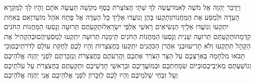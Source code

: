 \documentclass[../main/main.tex]{subfiles}
\begin{document}
\begin{multicols}{\ncols}
וַיְדַבֵּר יַהְוֶה אֶל מֹשֶׁה לֵּאמֹר\PreVerseSpace{}עֲשֵׂה לְךָ שְׁתֵּי חֲצוֹצְרֹת כֶּסֶף מִקְשָׁה תַּעֲשֶׂה אֹתָם וְהָיוּ לְךָ לְמִקְרָא הָעֵדָה וּלְמַסַּע אֶת הַמַּחֲנוֹת\PreVerseSpace{}וְתָקְעוּ בָּהֵן וְנוֹעֲדוּ אֵלֶיךָ כָּל הָעֵדָה אֶל פֶּתַח אֹהֶל מוֹעֵד\PreVerseSpace{}וְאִם בְּאַחַת יִתְקָעוּ וְנוֹעֲדוּ אֵלֶיךָ הַנְּשִׂיאִים רָאשֵׁי אַלְפֵי יִשְׂרָאֵל\PreVerseSpace{}וּתְקַעְתֶּם תְּרוּעָה וְנָסְעוּ הַמַּחֲנוֹת הַחֹנִים קֵדְמָה\PreVerseSpace{}וּתְקַעְתֶּם תְּרוּעָה שֵׁנִית וְנָסְעוּ הַמַּחֲנוֹת הַחֹנִים תֵּימָנָה תְּרוּעָה יִתְקְעוּ לְמַסְעֵיהֶם\PreVerseSpace{}וּבְהַקְהִיל אֶת הַקָּהָל תִּתְקְעוּ וְלֹא תָרִיעוּ\PreVerseSpace{}וּבְנֵי אַהֲרֹן הַכֹּהֲנִים יִתְקְעוּ בַּחֲצֹצְרוֹת וְהָיוּ לָכֶם לְחֻקַּת עוֹלָם לְדֹרֹתֵיכֶם\PreVerseSpace{}וְכִי תָבֹאוּ מִלְחָמָה בְּאַרְצְכֶם עַל הַצַּר הַצֹּרֵר אֶתְכֶם וַהֲרֵעֹתֶם בַּחֲצֹצְרֹת וְנַזְכַּרְתֶּם לִפְנֵי יַהְוֶה אֱלֹהֵיכֶם וְנוֹשַׁעְתֶּם מֵאֹיְבֵיכֶם\PreVerseSpace{}וּבְיוֹם שִׂמְחַתְכֶם וּבְמוֹעֲדֵיכֶם וּבְרָאשֵׁי חָדְשֵׁיכֶם וּתְקַעְתֶּם בַּחֲצֹצְרֹת עַל עֹלֹתֵיכֶם וְעַל זִבְחֵי שַׁלְמֵיכֶם וְהָיוּ לָכֶם לְזִכָּרוֹן לִפְנֵי אֱלֹהֵיכֶם אֲנִי יַהְוֶה אֱלֹהֵיכֶם\OpenSection{}\par

\end{multicols}
\end{document}

